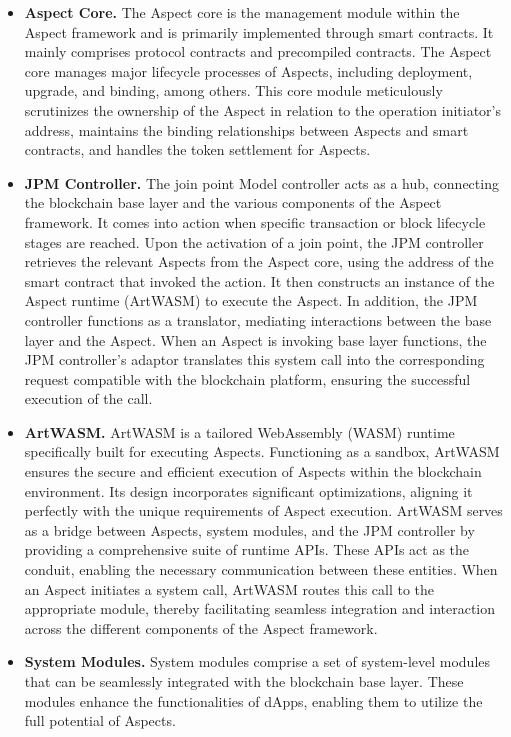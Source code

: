 \begin{itemize}
  \item \textbf{Aspect Core.} The Aspect core is the management module within the Aspect framework and is primarily implemented through smart contracts. It mainly comprises protocol contracts and precompiled contracts. The Aspect core manages major lifecycle processes of Aspects, including deployment, upgrade, and binding, among others. This core module meticulously scrutinizes the ownership of the Aspect in relation to the operation initiator's address, maintains the binding relationships between Aspects and smart contracts, and handles the token settlement for Aspects.
  
  \item \textbf{JPM Controller.} The join point Model controller acts as a hub, connecting the blockchain base layer and the various components of the Aspect framework. It comes into action when specific transaction or block lifecycle stages are reached. Upon the activation of a join point, the JPM controller retrieves the relevant Aspects from the Aspect core, using the address of the smart contract that invoked the action. It then constructs an instance of the Aspect runtime (ArtWASM) to execute the Aspect. In addition, the JPM controller functions as a translator, mediating interactions between the base layer and the Aspect. When an Aspect is invoking base layer functions, the JPM controller's adaptor translates this system call into the corresponding request compatible with the blockchain platform, ensuring the successful execution of the call.
  
  \item \textbf{ArtWASM.} ArtWASM is a tailored WebAssembly (WASM) runtime specifically built for executing Aspects. Functioning as a sandbox, ArtWASM ensures the secure and efficient execution of Aspects within the blockchain environment. Its design incorporates significant optimizations, aligning it perfectly with the unique requirements of Aspect execution. ArtWASM serves as a bridge between Aspects, system modules, and the JPM controller by providing a comprehensive suite of runtime APIs. These APIs act as the conduit, enabling the necessary communication between these entities. When an Aspect initiates a system call, ArtWASM routes this call to the appropriate module, thereby facilitating seamless integration and interaction across the different components of the Aspect framework.
  
  \item \textbf{System Modules.} System modules comprise a set of system-level modules that can be seamlessly integrated with the blockchain base layer. These modules enhance the functionalities of dApps, enabling them to utilize the full potential of Aspects.
  

\end{itemize}
